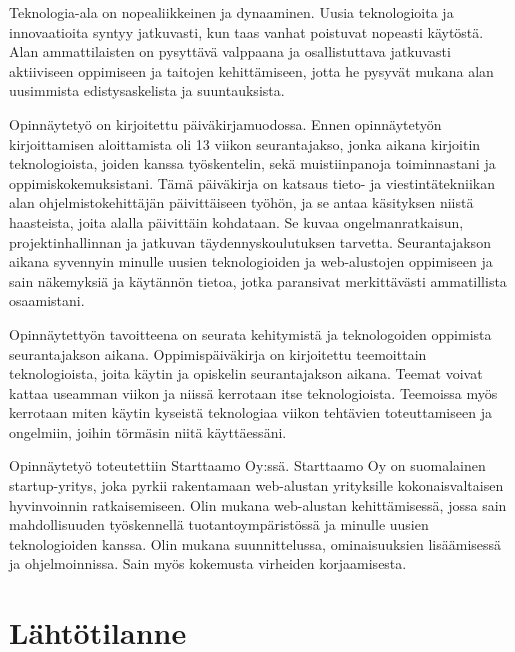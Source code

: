 \documentclass[11pt,a4paper,titlepage,oneside]{article}
\begin{document}
Teknologia-ala on nopealiikkeinen ja dynaaminen. 
Uusia teknologioita ja innovaatioita syntyy jatkuvasti, kun taas vanhat poistuvat nopeasti käytöstä.
Alan ammattilaisten on pysyttävä valppaana ja osallistuttava jatkuvasti aktiiviseen oppimiseen ja taitojen kehittämiseen,
jotta he pysyvät mukana alan uusimmista edistysaskelista ja suuntauksista.
\medskip




Opinnäytetyö on kirjoitettu päiväkirjamuodossa. 
Ennen opinnäytetyön kirjoittamisen aloittamista oli 13 viikon seurantajakso, jonka aikana kirjoitin teknologioista,
joiden kanssa työskentelin, sekä muistiinpanoja toiminnastani ja oppimiskokemuksistani.
Tämä päiväkirja on katsaus tieto- ja viestintätekniikan alan ohjelmistokehittäjän päivittäiseen työhön,
ja se antaa käsityksen niistä haasteista, joita alalla päivittäin kohdataan.
Se kuvaa ongelmanratkaisun, projektinhallinnan ja jatkuvan täydennyskoulutuksen tarvetta.
Seurantajakson aikana syvennyin minulle uusien teknologioiden ja web-alustojen oppimiseen ja sain näkemyksiä ja käytännön tietoa,
jotka paransivat merkittävästi ammatillista osaamistani.
\medskip



% 
Opinnäytettyön tavoitteena on seurata kehitymistä ja teknologoiden oppimista seurantajakson aikana.
% 
Oppimispäiväkirja on kirjoitettu teemoittain teknologioista, joita käytin ja opiskelin seurantajakson aikana.
Teemat voivat kattaa useamman viikon ja niissä kerrotaan itse teknologioista. 
Teemoissa myös kerrotaan miten käytin kyseistä teknologiaa viikon tehtävien toteuttamiseen ja
ongelmiin, joihin törmäsin niitä käyttäessäni.
\medskip






Opinnäytetyö toteutettiin Starttaamo Oy:ssä. Starttaamo Oy on suomalainen startup-yritys,
joka pyrkii rakentamaan web-alustan yrityksille kokonaisvaltaisen hyvinvoinnin ratkaisemiseen.
Olin mukana web-alustan kehittämisessä, jossa
sain mahdollisuuden työskennellä tuotantoympäristössä ja minulle uusien teknologioiden kanssa.
Olin mukana suunnittelussa, ominaisuuksien lisäämisessä ja ohjelmoinnissa. 
Sain myös kokemusta virheiden korjaamisesta.

\medskip










\newpage
\section{Lähtötilanne}         %
\end{document}
